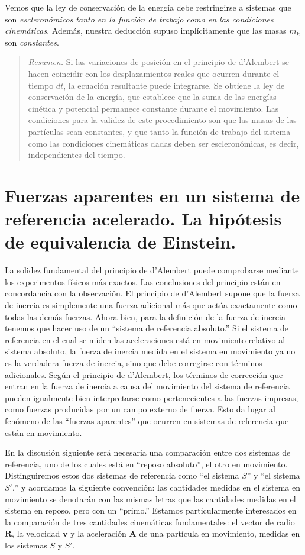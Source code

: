 \documentclass[12pt,a4paper]{book}
\begin{document}
Vemos que la ley de conservación de la energía debe restringirse a sistemas que son \textit{escleronómicos tanto en la función de trabajo como en las condiciones cinemáticas}. Además, nuestra deducción supuso implícitamente que las masas $m_k$ son \textit{constantes}.

\begin{quote}
\textit{Resumen.} Si las variaciones de posición en el principio de d'Alembert se hacen coincidir con los desplazamientos reales que ocurren durante el tiempo $dt$, la ecuación resultante puede integrarse. Se obtiene la ley de conservación de la energía, que establece que la suma de las energías cinética y potencial permanece constante durante el movimiento. Las condiciones para la validez de este procedimiento son que las masas de las partículas sean constantes, y que tanto la función de trabajo del sistema como las condiciones cinemáticas dadas deben ser escleronómicas, es decir, independientes del tiempo.
\end{quote}

\section{Fuerzas aparentes en un sistema de referencia acelerado. La hipótesis de equivalencia de Einstein.}

La solidez fundamental del principio de d'Alembert puede comprobarse mediante los experimentos físicos más exactos. Las conclusiones del principio están en concordancia con la observación. El principio de d'Alembert supone que la fuerza de inercia es simplemente una fuerza adicional más que actúa exactamente como todas las demás fuerzas. Ahora bien, para la definición de la fuerza de inercia tenemos que hacer uso de un ``sistema de referencia absoluto.'' Si el sistema de referencia en el cual se miden las aceleraciones está en movimiento relativo al sistema absoluto, la fuerza de inercia medida en el sistema en movimiento ya no es la verdadera fuerza de inercia, sino que debe corregirse con términos adicionales. Según el principio de d'Alembert, los términos de corrección que entran en la fuerza de inercia a causa del movimiento del sistema de referencia pueden igualmente bien interpretarse como pertenecientes a las fuerzas impresas, como fuerzas producidas por un campo externo de fuerza. Esto da lugar al fenómeno de las ``fuerzas aparentes'' que ocurren en sistemas de referencia que están en movimiento.

En la discusión siguiente será necesaria una comparación entre dos sistemas de referencia, uno de los cuales está en ``reposo absoluto'', el otro en movimiento. Distinguiremos estos dos sistemas de referencia como ``el sistema $S$'' y ``el sistema $S'$,'' y acordamos la siguiente convención: las cantidades medidas en el sistema en movimiento se denotarán con las mismas letras que las cantidades medidas en el sistema en reposo, pero con un ``primo.'' Estamos particularmente interesados en la comparación de tres cantidades cinemáticas fundamentales: el vector de radio $\mathbf{R}$, la velocidad $\mathbf{v}$ y la aceleración $\mathbf{A}$ de una partícula en movimiento, medidas en los sistemas $S$ y $S'$.
\end{document}
